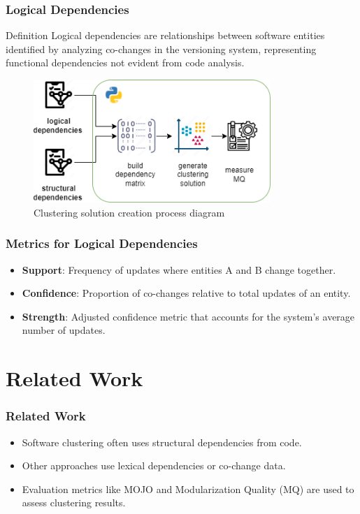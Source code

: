 \documentclass{beamer}
\begin{document}
\begin{frame}
\frametitle{Logical Dependencies}
\begin{block}{Definition}
Logical dependencies are relationships between software entities identified by analyzing co-changes in the versioning system, representing functional dependencies not evident from code analysis.
\end{block}

\begin{center}
     \begin{figure}
    \includegraphics[width=0.8\textwidth]{clustering-generation.png}
    \caption{Clustering solution creation process diagram}
    \label{fig:clustering-gen}
     \end{figure}
\end{center}
\end{frame}

\begin{frame}
\frametitle{Metrics for Logical Dependencies}
\begin{itemize}
    \item \textbf{Support}: Frequency of updates where entities A and B change together.
    \item \textbf{Confidence}: Proportion of co-changes relative to total updates of an entity.
    \item \textbf{Strength}: Adjusted confidence metric that accounts for the system's average number of updates.
\end{itemize}
\end{frame}

\section{Related Work}

\begin{frame}
\frametitle{Related Work}
\begin{itemize}
    \item Software clustering often uses structural dependencies from code.
    \item Other approaches use lexical dependencies or co-change data.
    \item Evaluation metrics like MOJO and Modularization Quality (MQ) are used to assess clustering results.
\end{itemize}
\end{frame}
\end{document}
